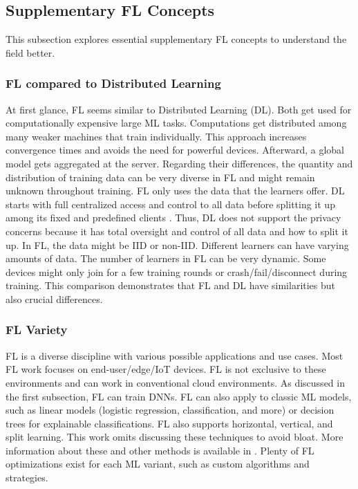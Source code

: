 \subsection{Supplementary FL Concepts}

This subsection explores essential supplementary FL concepts to understand the field better.

\subsubsection{FL compared to Distributed Learning}

At first glance, FL seems similar to Distributed Learning (DL).
Both get used for computationally expensive large ML tasks.
Computations get distributed among many weaker machines that train individually.
This approach increases convergence times and avoids the need for powerful devices. 
Afterward, a global model gets aggregated at the server.
Regarding their differences, the quantity and distribution of training data can be very diverse in FL and might remain unknown throughout training.
FL only uses the data that the learners offer.
DL starts with full centralized access and control to all data before splitting it up among its fixed and predefined clients \cite{book:fl}.
Thus, DL does not support the privacy concerns because it has total oversight and control of all data and how to split it up.
In FL, the data might be IID or non-IID.
Different learners can have varying amounts of data.
The number of learners in FL can be very dynamic.
Some devices might only join for a few training rounds or crash/fail/disconnect during training.
This comparison demonstrates that FL and DL have similarities but also crucial differences.

\subsubsection{FL Variety}
FL is a diverse discipline with various possible applications and use cases.
Most FL work focuses on end-user/edge/IoT devices.
FL is not exclusive to these environments and can work in conventional cloud environments.
As discussed in the first subsection, FL can train DNNs.
FL can also apply to classic ML models, such as linear models (logistic regression, classification, and more) or decision trees for explainable classifications.
FL also supports horizontal, vertical, and split learning.
This work omits discussing these techniques to avoid bloat.
More information about these and other methods is available in \cite{book:fl}.
Plenty of FL optimizations exist for each ML variant, such as custom algorithms and strategies.

